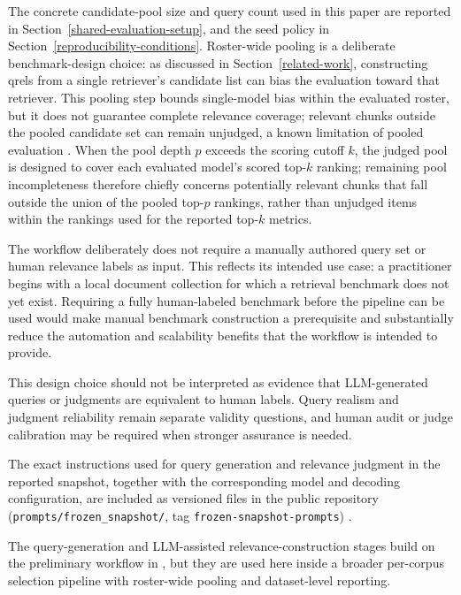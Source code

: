 The concrete candidate-pool size and query count used in this paper are reported in Section~\ref{shared-evaluation-setup}, and the seed policy in Section~\ref{reproducibility-conditions}. Roster-wide pooling is a deliberate benchmark-design choice: as discussed in Section~\ref{related-work}, constructing qrels from a single retriever's candidate list can bias the evaluation toward that retriever. This pooling step bounds single-model bias within the evaluated roster, but it does not guarantee complete relevance coverage; relevant chunks outside the pooled candidate set can remain unjudged, a known limitation of pooled evaluation \citep{zobel1998reliable, buckley2004retrieval}. When the pool depth $p$ exceeds the scoring cutoff $k$, the judged pool is designed to cover each evaluated model's scored top-$k$ ranking; remaining pool incompleteness therefore chiefly concerns potentially relevant chunks that fall outside the union of the pooled top-$p$ rankings, rather than unjudged items within the rankings used for the reported top-$k$ metrics.

The workflow deliberately does not require a manually authored query set or human relevance labels as input. This reflects its intended use case: a practitioner begins with a local document collection for which a retrieval benchmark does not yet exist. Requiring a fully human-labeled benchmark before the pipeline can be used would make manual benchmark construction a prerequisite and substantially reduce the automation and scalability benefits that the workflow is intended to provide.

This design choice should not be interpreted as evidence that LLM-generated queries or judgments are equivalent to human labels. Query realism and judgment reliability remain separate validity questions, and human audit or judge calibration may be required when stronger assurance is needed.

The exact instructions used for query generation and relevance judgment in the reported snapshot, together with the corresponding model and decoding configuration, are included as versioned files in the public repository (\texttt{prompts/frozen\_snapshot/}, tag \texttt{frozen-snapshot-prompts}) \citep{GitHub_RagRetrievalBench}.

The query-generation and LLM-assisted relevance-construction stages build on the preliminary workflow in \citet{Karakaya_Conference_2025}, but they are used here inside a broader per-corpus selection pipeline with roster-wide pooling and dataset-level reporting.

